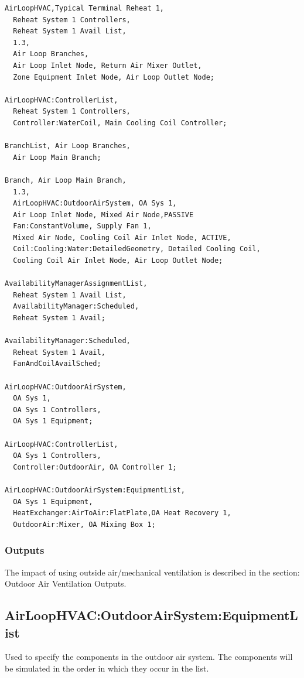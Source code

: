 \begin{lstlisting}
AirLoopHVAC,Typical Terminal Reheat 1,
  Reheat System 1 Controllers,
  Reheat System 1 Avail List,
  1.3,
  Air Loop Branches,
  Air Loop Inlet Node, Return Air Mixer Outlet,
  Zone Equipment Inlet Node, Air Loop Outlet Node;

AirLoopHVAC:ControllerList,
  Reheat System 1 Controllers,
  Controller:WaterCoil, Main Cooling Coil Controller;

BranchList, Air Loop Branches,
  Air Loop Main Branch;

Branch, Air Loop Main Branch,
  1.3,
  AirLoopHVAC:OutdoorAirSystem, OA Sys 1,
  Air Loop Inlet Node, Mixed Air Node,PASSIVE
  Fan:ConstantVolume, Supply Fan 1,
  Mixed Air Node, Cooling Coil Air Inlet Node, ACTIVE,
  Coil:Cooling:Water:DetailedGeometry, Detailed Cooling Coil,
  Cooling Coil Air Inlet Node, Air Loop Outlet Node;

AvailabilityManagerAssignmentList, 
  Reheat System 1 Avail List,
  AvailabilityManager:Scheduled,
  Reheat System 1 Avail;

AvailabilityManager:Scheduled, 
  Reheat System 1 Avail,
  FanAndCoilAvailSched;

AirLoopHVAC:OutdoorAirSystem,
  OA Sys 1,
  OA Sys 1 Controllers,
  OA Sys 1 Equipment;

AirLoopHVAC:ControllerList,
  OA Sys 1 Controllers,
  Controller:OutdoorAir, OA Controller 1;

AirLoopHVAC:OutdoorAirSystem:EquipmentList,
  OA Sys 1 Equipment,
  HeatExchanger:AirToAir:FlatPlate,OA Heat Recovery 1,
  OutdoorAir:Mixer, OA Mixing Box 1;
\end{lstlisting}

\subsubsection{Outputs}\label{outputs-2-001}

The impact of using outside air/mechanical ventilation is described in the section: Outdoor Air Ventilation Outputs.

\subsection{AirLoopHVAC:OutdoorAirSystem:EquipmentList}\label{airloophvacoutdoorairsystemequipmentlist}

Used to specify the components in the outdoor air system. The components will be simulated in the order in which they occur in the list.

